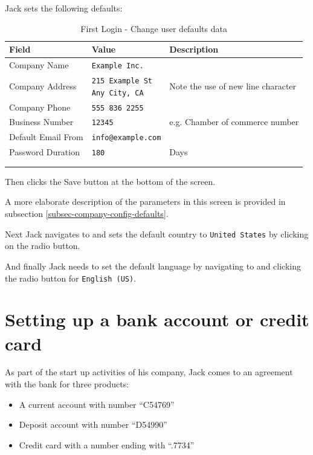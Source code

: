 Jack sets the following defaults:
\begin{longtable}{ llp{6cm} }
        Field & Value & Description \\ \hline
        \endhead
        Company Name & \texttt{Example Inc.} & \\
        Company Address &  \makecell[l]{\texttt{215 Example St} \\  \texttt{Any City, CA}} & Note the use of new line character\\
        Company Phone &  \texttt{555 836 2255} & \\
        Business Number &  \texttt{12345} & e.g. Chamber of commerce number\\
        Default Email \index{email} From & \texttt{info@example.com} & \\
        Password Duration &  \texttt{180} & Days\\
        \\
\caption{First Login - Change user defaults data}
\label{fig:first-user-user-default-data}
\end{longtable}

Then clicks the Save button at the bottom of the screen.

A more elaborate description of the parameters in this screen is provided in subsection
\ref{subsec-company-config-defaults}.

Next Jack navigates to  and sets the default country to \texttt{United States} by clicking on the radio button.

And finally Jack needs to set the default language by navigating to  and clicking the radio button for \texttt{English (US)}.

\section{Setting up a bank account or credit card}
\label{sec-first-login-setup-bank-account}

As part of the start up activities of his company, Jack comes to an agreement with the
bank for three products:

\begin{itemize}
\item A current account with number ``C54769''
\item Deposit account with number ``D54990''
\item Credit card with a number ending with ``.7734''
\end{itemize}

